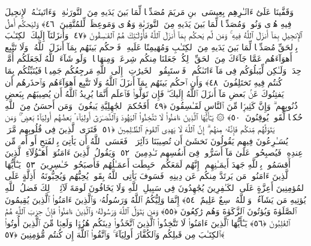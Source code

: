  وَقَفَّينَا عَلَىٰٓ ءَاثَـٰرِهِم بِعِيسَى ٱبنِ مَريَمَ مُصَدِّقًۭا لِّمَا بَينَ يَدَيهِ مِنَ ٱلتَّورَىٰةِ ۖ وَءَاتَينَـٰهُ ٱلإِنجِيلَ فِيهِ هُدًۭى وَنُورٌۭ وَمُصَدِّقًۭا لِّمَا بَينَ يَدَيهِ مِنَ ٱلتَّورَىٰةِ وَهُدًۭى وَمَوعِظَةًۭ لِّلمُتَّقِينَ ﴿٤٦﴾
 وَليَحكُم أَهلُ ٱلإِنجِيلِ بِمَآ أَنزَلَ ٱللَّهُ فِيهِ ۚ وَمَن لَّم يَحكُم بِمَآ أَنزَلَ ٱللَّهُ فَأُو۟لَـٰٓئِكَ هُمُ ٱلفَـٰسِقُونَ ﴿٤٧﴾
 وَأَنزَلنَآ إِلَيكَ ٱلكِتَـٰبَ بِٱلحَقِّ مُصَدِّقًۭا لِّمَا بَينَ يَدَيهِ مِنَ ٱلكِتَـٰبِ وَمُهَيمِنًا عَلَيهِ ۖ فَٱحكُم بَينَهُم بِمَآ أَنزَلَ ٱللَّهُ ۖ وَلَا تَتَّبِع أَهوَآءَهُم عَمَّا جَآءَكَ مِنَ ٱلحَقِّ ۚ لِكُلٍّۢ جَعَلنَا مِنكُم شِرعَةًۭ وَمِنهَاجًۭا ۚ وَلَو شَآءَ ٱللَّهُ لَجَعَلَكُم أُمَّةًۭ وَٟحِدَةًۭ وَلَـٰكِن لِّيَبلُوَكُم فِى مَآ ءَاتَىٰكُم ۖ فَٱستَبِقُوا۟ ٱلخَيرَٰتِ ۚ إِلَى ٱللَّهِ مَرجِعُكُم جَمِيعًۭا فَيُنَبِّئُكُم بِمَا كُنتُم فِيهِ تَختَلِفُونَ ﴿٤٨﴾
 وَأَنِ ٱحكُم بَينَهُم بِمَآ أَنزَلَ ٱللَّهُ وَلَا تَتَّبِع أَهوَآءَهُم وَٱحذَرهُم أَن يَفتِنُوكَ عَنۢ بَعضِ مَآ أَنزَلَ ٱللَّهُ إِلَيكَ ۖ فَإِن تَوَلَّوا۟ فَٱعلَم أَنَّمَا يُرِيدُ ٱللَّهُ أَن يُصِيبَهُم بِبَعضِ ذُنُوبِهِم ۗ وَإِنَّ كَثِيرًۭا مِّنَ ٱلنَّاسِ لَفَـٰسِقُونَ ﴿٤٩﴾
 أَفَحُكمَ ٱلجَٰهِلِيَّةِ يَبغُونَ ۚ وَمَن أَحسَنُ مِنَ ٱللَّهِ حُكمًۭا لِّقَومٍۢ يُوقِنُونَ ﴿٥٠﴾
 ۞ يَـٰٓأَيُّهَا ٱلَّذِينَ ءَامَنُوا۟ لَا تَتَّخِذُوا۟ ٱليَهُودَ وَٱلنَّصَـٰرَىٰٓ أَولِيَآءَ ۘ بَعضُهُم أَولِيَآءُ بَعضٍۢ ۚ وَمَن يَتَوَلَّهُم مِّنكُم فَإِنَّهُۥ مِنهُم ۗ إِنَّ ٱللَّهَ لَا يَهدِى ٱلقَومَ ٱلظَّـٰلِمِينَ ﴿٥١﴾
 فَتَرَى ٱلَّذِينَ فِى قُلُوبِهِم مَّرَضٌۭ يُسَـٰرِعُونَ فِيهِم يَقُولُونَ نَخشَىٰٓ أَن تُصِيبَنَا دَآئِرَةٌۭ ۚ فَعَسَى ٱللَّهُ أَن يَأتِىَ بِٱلفَتحِ أَو أَمرٍۢ مِّن عِندِهِۦ فَيُصبِحُوا۟ عَلَىٰ مَآ أَسَرُّوا۟ فِىٓ أَنفُسِهِم نَـٰدِمِينَ ﴿٥٢﴾
 وَيَقُولُ ٱلَّذِينَ ءَامَنُوٓا۟ أَهَـٰٓؤُلَآءِ ٱلَّذِينَ أَقسَمُوا۟ بِٱللَّهِ جَهدَ أَيمَـٰنِهِم ۙ إِنَّهُم لَمَعَكُم ۚ حَبِطَت أَعمَـٰلُهُم فَأَصبَحُوا۟ خَـٰسِرِينَ ﴿٥٣﴾
 يَـٰٓأَيُّهَا ٱلَّذِينَ ءَامَنُوا۟ مَن يَرتَدَّ مِنكُم عَن دِينِهِۦ فَسَوفَ يَأتِى ٱللَّهُ بِقَومٍۢ يُحِبُّهُم وَيُحِبُّونَهُۥٓ أَذِلَّةٍ عَلَى ٱلمُؤمِنِينَ أَعِزَّةٍ عَلَى ٱلكَـٰفِرِينَ يُجَٰهِدُونَ فِى سَبِيلِ ٱللَّهِ وَلَا يَخَافُونَ لَومَةَ لَآئِمٍۢ ۚ ذَٟلِكَ فَضلُ ٱللَّهِ يُؤتِيهِ مَن يَشَآءُ ۚ وَٱللَّهُ وَٟسِعٌ عَلِيمٌ ﴿٥٤﴾
 إِنَّمَا وَلِيُّكُمُ ٱللَّهُ وَرَسُولُهُۥ وَٱلَّذِينَ ءَامَنُوا۟ ٱلَّذِينَ يُقِيمُونَ ٱلصَّلَوٰةَ وَيُؤتُونَ ٱلزَّكَوٰةَ وَهُم رَٰكِعُونَ ﴿٥٥﴾
 وَمَن يَتَوَلَّ ٱللَّهَ وَرَسُولَهُۥ وَٱلَّذِينَ ءَامَنُوا۟ فَإِنَّ حِزبَ ٱللَّهِ هُمُ ٱلغَٰلِبُونَ ﴿٥٦﴾
 يَـٰٓأَيُّهَا ٱلَّذِينَ ءَامَنُوا۟ لَا تَتَّخِذُوا۟ ٱلَّذِينَ ٱتَّخَذُوا۟ دِينَكُم هُزُوًۭا وَلَعِبًۭا مِّنَ ٱلَّذِينَ أُوتُوا۟ ٱلكِتَـٰبَ مِن قَبلِكُم وَٱلكُفَّارَ أَولِيَآءَ ۚ وَٱتَّقُوا۟ ٱللَّهَ إِن كُنتُم مُّؤمِنِينَ ﴿٥٧﴾
